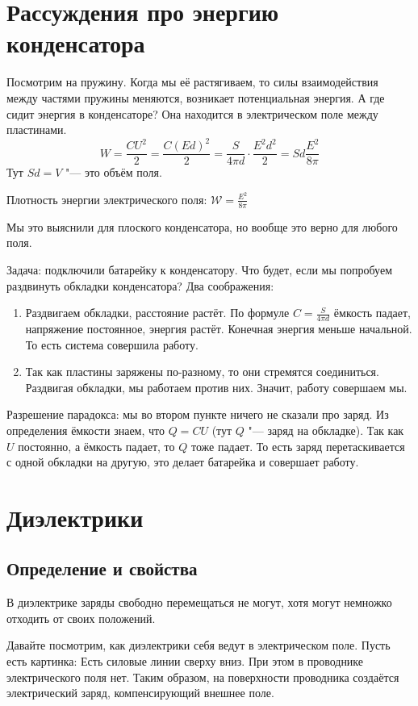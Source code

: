 
\section{Рассуждения про энергию конденсатора}
    Посмотрим на пружину.
    Когда мы её растягиваем, то силы взаимодействия между частями пружины
    меняются, возникает потенциальная энергия.
    А где сидит энергия в конденсаторе?
    Она находится в электрическом поле между пластинами.
    \[ W = \frac{CU^2}2 = \frac{C(Ed)^2}2 = \frac{S}{4\pi d}\cdot\frac{E^2d^2}{2} = Sd \frac{E^2}{8\pi} \]
    Тут $Sd=V$ "--- это объём поля. 
    \begin{Def}
      Плотность энергии электрического поля: $\mathcal{W} = \frac{E^2}{8\pi}$
    \end{Def}
    \begin{Rem}
      Мы это выяснили для плоского конденсатора, но вообще это верно для любого поля.
    \end{Rem}

    Задача: подключили батарейку к конденсатору.
    Что будет, если мы попробуем раздвинуть обкладки конденсатора?
    Два соображения:
    \begin{enumerate}
    \item Раздвигаем обкладки, расстояние растёт.
          По формуле $C=\frac{S}{4\pi d}$ ёмкость падает, напряжение постоянное, энергия растёт.
          Конечная энергия меньше начальной.
          То есть система совершила работу.
    \item Так как пластины заряжены по-разному, то они стремятся соединиться.
          Раздвигая обкладки, мы работаем против них.
          Значит, работу совершаем мы.
    \end{enumerate}
    Разрешение парадокса: мы во втором пункте ничего не сказали про заряд.
    Из определения ёмкости знаем, что $Q=CU$ (тут $Q$ "--- заряд на обкладке).
    Так как $U$ постоянно, а ёмкость падает, то $Q$ тоже падает.
    То есть заряд перетаскивается с одной обкладки на другую, это делает батарейка и совершает работу.

\section{Диэлектрики}
  \subsection{Определение и свойства}
    \begin{Def}
      В диэлектрике заряды свободно перемещаться не могут, хотя могут немножко отходить от своих положений.
    \end{Def}
    Давайте посмотрим, как диэлектрики себя ведут в электрическом поле.
    Пусть есть картинка:
    Есть силовые линии сверху вниз.
    При этом в проводнике электрического поля нет.
    Таким образом, на поверхности проводника создаётся электрический заряд, компенсирующий внешнее поле.

